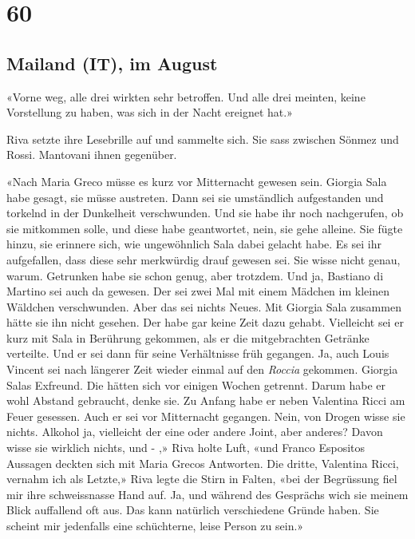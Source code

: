 \chapter{60}

\section{Mailand (IT), im 
August}



«Vorne weg, alle drei wirkten sehr betroffen. Und alle drei meinten,
keine Vorstellung zu haben, was sich in der Nacht ereignet hat.»

Riva setzte ihre Lesebrille auf und sammelte sich. Sie sass zwischen
Sönmez und Rossi. Mantovani ihnen gegenüber.

«Nach Maria Greco müsse es kurz vor Mitternacht gewesen sein. Giorgia
Sala habe gesagt, sie müsse austreten. Dann sei sie umständlich
aufgestanden und torkelnd in der Dunkelheit verschwunden. Und sie habe
ihr noch nachgerufen, ob sie mitkommen solle, und diese habe
geantwortet, nein, sie gehe alleine. Sie fügte hinzu, sie erinnere sich,
wie ungewöhnlich Sala dabei gelacht habe. Es sei ihr aufgefallen, dass diese
sehr merkwürdig drauf gewesen sei. Sie wisse nicht genau, warum.
Getrunken habe sie schon genug, aber trotzdem. Und ja, Bastiano di
Martino sei auch da gewesen. Der sei zwei Mal mit einem Mädchen im
kleinen Wäldchen verschwunden. Aber das sei nichts Neues. Mit Giorgia
Sala zusammen hätte sie ihn nicht gesehen. Der habe gar keine Zeit dazu
gehabt. Vielleicht sei er kurz mit Sala in Berührung gekommen, als er
die mitgebrachten Getränke verteilte. Und er sei dann für seine
Verhältnisse früh gegangen. Ja, auch Louis Vincent sei nach längerer
Zeit wieder einmal auf den \emph{Roccia} gekommen. Giorgia Salas
Exfreund. Die hätten sich vor einigen Wochen getrennt. Darum habe er
wohl Abstand gebraucht, denke sie. Zu Anfang habe er neben Valentina
Ricci am Feuer gesessen. Auch er sei vor Mitternacht gegangen. Nein, von
Drogen wisse sie nichts. Alkohol ja, vielleicht der eine oder andere
Joint, aber anderes? Davon wisse sie wirklich nichts, und - ,»
Riva holte Luft, «und Franco Espositos Aussagen deckten sich mit Maria Grecos Antworten. Die
dritte, Valentina Ricci, vernahm ich als Letzte,» Riva legte die Stirn
in Falten, «bei der Begrüssung fiel mir ihre schweissnasse Hand auf. Ja,
und während des Gesprächs wich sie meinem Blick auffallend oft aus. Das
kann natürlich verschiedene Gründe haben. Sie scheint mir jedenfalls
eine schüchterne, leise Person zu sein.»

